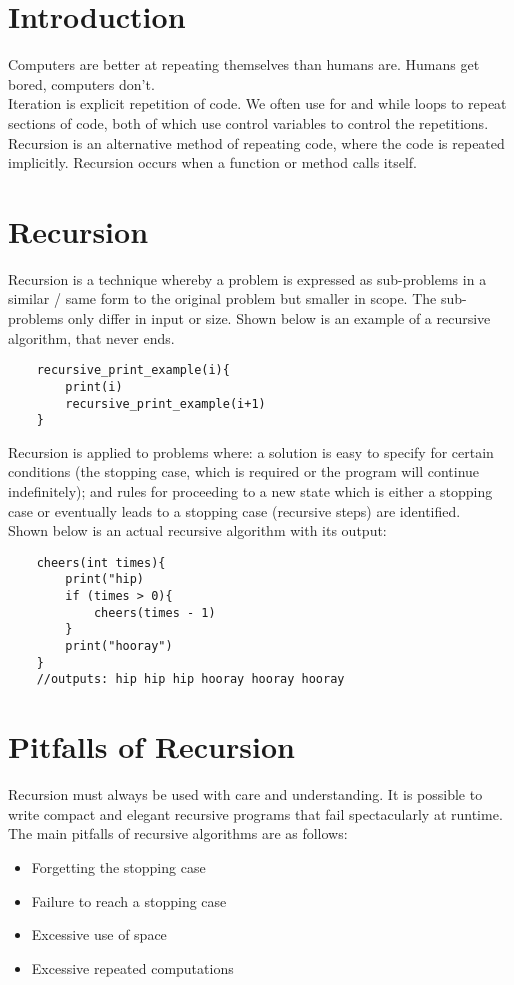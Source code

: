 
\section{Introduction}
Computers are better at repeating themselves than humans are. Humans get bored, computers don't.\\

Iteration is explicit repetition of code. We often use for and while loops to repeat sections of code, both of which use control variables to control the repetitions.\\

Recursion is an alternative method of repeating code, where the code is repeated implicitly. Recursion occurs when a function or method calls itself.

\section{Recursion}
Recursion is a technique whereby a problem is expressed as sub-problems in a similar / same form to the original problem but smaller in scope. The sub-problems only differ in input or size. Shown below is an example of a recursive algorithm, that never ends.
\begin{verbatim}
    recursive_print_example(i){
        print(i)
        recursive_print_example(i+1)
    }
\end{verbatim}
Recursion is applied to problems where: a solution is easy to specify for certain conditions (the stopping case, which is required or the program will continue indefinitely); and rules for proceeding to a new state which is either a stopping case or eventually leads to a stopping case (recursive steps) are identified.\\

Shown below is an actual recursive algorithm with its output:
\begin{verbatim}
    cheers(int times){
        print("hip)
        if (times > 0){
            cheers(times - 1)
        }
        print("hooray")
    }
    //outputs: hip hip hip hooray hooray hooray
\end{verbatim}

\section{Pitfalls of Recursion}
Recursion must always be used with care and understanding. It is possible to write compact and elegant recursive programs that fail spectacularly at runtime. The main pitfalls of recursive algorithms are as follows:
\begin{itemize}
    \item Forgetting the stopping case
    \item Failure to reach a stopping case
    \item Excessive use of space
    \item Excessive repeated computations
\end{itemize}

